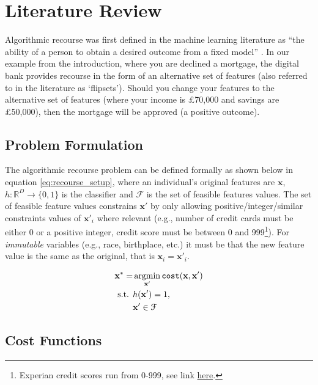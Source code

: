 \chapter{Literature Review} \label{chapter:lit_review}

Algorithmic recourse was first defined in the machine learning literature as ``the ability of a person to obtain a desired outcome from a fixed model'' \citep{ustunActionableRecourseLinear2019}. In our example from the introduction, where you are declined a mortgage, the digital bank provides recourse in the form of an alternative set of features (also referred to in the literature as `flipsets'). Should you change your features to the alternative set of features (where your income is £70,000 and savings are £50,000), then the mortgage will be approved (a positive outcome).


\section{Problem Formulation}
The algorithmic recourse problem can be defined formally as shown below in equation \ref{eq:recourse_setup}, where an individual's original features are $\mathbf{x}$, $h: \mathbb{R}^D \to \{0,1\}$ is the classifier and $\mathcal{F}$ is the set of feasible features values. The set of feasible feature values constrains $\mathbf{x}'$ by only allowing positive/integer/similar constraints values of $\mathbf{x}'_i$ where relevant (e.g., number of credit cards must be either 0 or a positive integer, credit score must be between 0 and 999\footnote{Experian credit scores run from 0-999, see link \href{https://www.experian.co.uk/consumer/experian-credit-score.html}{here}.}). For \textit{immutable} variables (e.g., race, birthplace, etc.) it must be that the new feature value is the same as the original, that is $\mathbf{x}_i=\mathbf{x}'_i$.

\begin{align} \label{eq:recourse_setup}
	\mathbf{x}^* = & \operatorname*{argmin}_{\mathbf{x}'}  \operatorname*{\texttt{cost}}(\mathbf{x}, \mathbf{x}') \\ \nonumber
	\text{s.t. } & h(\mathbf{x}') = 1, \\ \nonumber
	& \mathbf{x}' \in \mathcal{F}
\end{align}

\section{Cost Functions} \label{section:cost_functions_lit_review}

